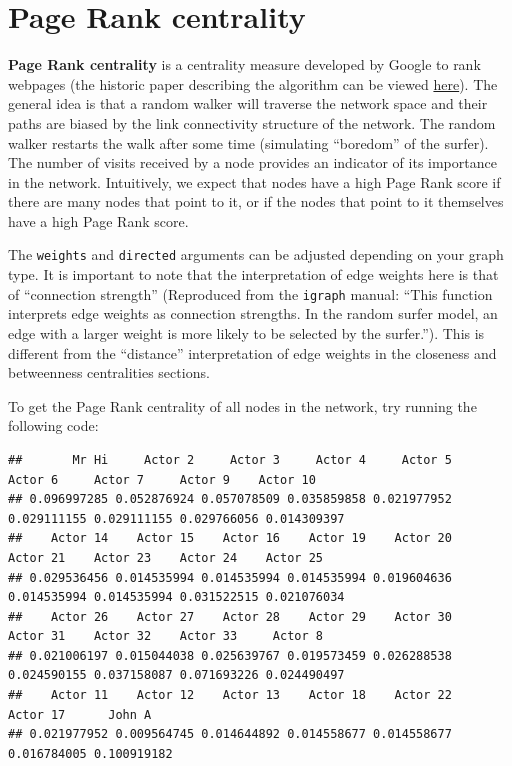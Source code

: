 \documentclass[
]{book}
\newenvironment{Shaded}{\begin{snugshade}}{\end{snugshade}}
\newcommand{\AttributeTok}[1]{\textcolor[rgb]{0.13,0.29,0.53}{#1}}
\newcommand{\CommentTok}[1]{\textcolor[rgb]{0.56,0.35,0.01}{\textit{#1}}}
\newcommand{\ConstantTok}[1]{\textcolor[rgb]{0.56,0.35,0.01}{#1}}
\newcommand{\FunctionTok}[1]{\textcolor[rgb]{0.13,0.29,0.53}{\textbf{#1}}}
\newcommand{\NormalTok}[1]{#1}
\newcommand{\SpecialCharTok}[1]{\textcolor[rgb]{0.81,0.36,0.00}{\textbf{#1}}}
\begin{document}
\section{Page Rank centrality}\label{page-rank-centrality}

\textbf{Page Rank centrality} is a centrality measure developed by Google to rank webpages (the historic paper describing the algorithm can be viewed \href{http://infolab.stanford.edu/~backrub/google.html}{here}). The general idea is that a random walker will traverse the network space and their paths are biased by the link connectivity structure of the network. The random walker restarts the walk after some time (simulating ``boredom'' of the surfer). The number of visits received by a node provides an indicator of its importance in the network. Intuitively, we expect that nodes have a high Page Rank score if there are many nodes that point to it, or if the nodes that point to it themselves have a high Page Rank score.

The \texttt{weights} and \texttt{directed} arguments can be adjusted depending on your graph type. It is important to note that the interpretation of edge weights here is that of ``connection strength'' (Reproduced from the \texttt{igraph} manual: ``This function interprets edge weights as connection strengths. In the random surfer model, an edge with a larger weight is more likely to be selected by the surfer.''). This is different from the ``distance'' interpretation of edge weights in the closeness and betweenness centralities sections.

To get the Page Rank centrality of all nodes in the network, try running the following code:

\begin{Shaded}
\end{Shaded}

\begin{verbatim}
##       Mr Hi     Actor 2     Actor 3     Actor 4     Actor 5     Actor 6     Actor 7     Actor 9    Actor 10 
## 0.096997285 0.052876924 0.057078509 0.035859858 0.021977952 0.029111155 0.029111155 0.029766056 0.014309397 
##    Actor 14    Actor 15    Actor 16    Actor 19    Actor 20    Actor 21    Actor 23    Actor 24    Actor 25 
## 0.029536456 0.014535994 0.014535994 0.014535994 0.019604636 0.014535994 0.014535994 0.031522515 0.021076034 
##    Actor 26    Actor 27    Actor 28    Actor 29    Actor 30    Actor 31    Actor 32    Actor 33     Actor 8 
## 0.021006197 0.015044038 0.025639767 0.019573459 0.026288538 0.024590155 0.037158087 0.071693226 0.024490497 
##    Actor 11    Actor 12    Actor 13    Actor 18    Actor 22    Actor 17      John A 
## 0.021977952 0.009564745 0.014644892 0.014558677 0.014558677 0.016784005 0.100919182
\end{verbatim}
\end{document}
